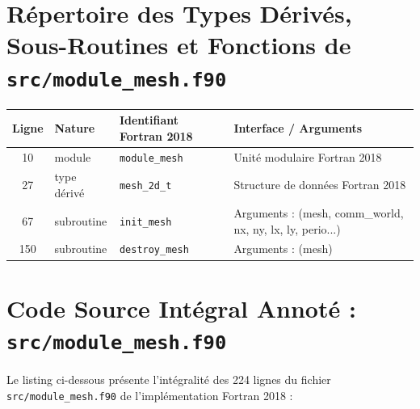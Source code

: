 \documentclass[10pt,a4paper,oneside]{book}
\begin{document}
\section{Répertoire des Types Dérivés, Sous-Routines et Fonctions de \texttt{src/module\_mesh.f90}}
\begin{center}\small
\begin{tabular}{clll}
\toprule
\textbf{Ligne} & \textbf{Nature} & \textbf{Identifiant Fortran 2018} & \textbf{Interface / Arguments} \\
\midrule
10 & module & \texttt{module\_mesh} & Unité modulaire Fortran 2018 \\
27 & type dérivé & \texttt{mesh\_2d\_t} & Structure de données Fortran 2018 \\
67 & subroutine & \texttt{init\_mesh} & Arguments : (mesh, comm\_world, nx, ny, lx, ly, perio...) \\
150 & subroutine & \texttt{destroy\_mesh} & Arguments : (mesh) \\
\bottomrule
\end{tabular}
\end{center}

\section{Code Source Intégral Annoté : \texttt{src/module\_mesh.f90}}
Le listing ci-dessous présente l'intégralité des 224 lignes du fichier \texttt{src/module\_mesh.f90} de l'implémentation Fortran 2018 :
\end{document}
